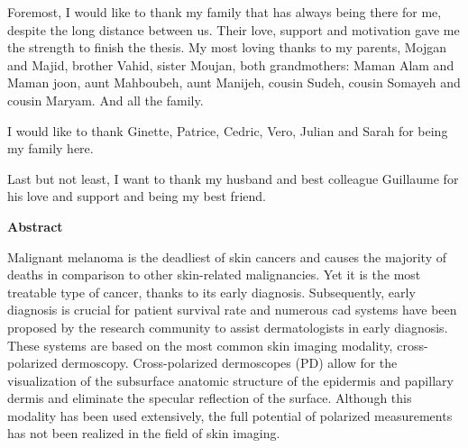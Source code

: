 Foremost, I would like to thank my family that has always being there for me, despite the long distance between us.
Their love, support and motivation gave me the strength to finish the thesis.
My most loving thanks to my parents, Mojgan and Majid, brother Vahid, sister Moujan, both grandmothers: Maman Alam and Maman joon, aunt Mahboubeh, aunt Manijeh, cousin Sudeh, cousin Somayeh and cousin Maryam.
And all the family.

I would like to thank Ginette, Patrice, Cedric, Vero, Julian and Sarah for being my family here.


Last but not least, I want to thank my husband and best colleague Guillaume for his love and support and being my best friend. 
  

 

\cleardoublepage
\doublespacing


\tableofcontents
\cleardoublepage

%

\singlespacing
\begin{center}\textbf{Abstract}\\\end{center}
Malignant melanoma is the deadliest of skin cancers and causes the majority of deaths in comparison to other skin-related malignancies.
Yet it is the most treatable type of cancer, thanks to its early diagnosis.
Subsequently, early diagnosis is crucial for patient survival rate and numerous \ac{cad} systems have been proposed by the research community to assist dermatologists in early diagnosis.
These systems are based on the most common skin imaging modality, cross-polarized dermoscopy.
Cross-polarized dermoscopes (PD) allow for the visualization of the subsurface anatomic structure of the epidermis and papillary dermis and eliminate the specular reflection of the surface.
Although this modality has been used extensively, the full potential of polarized measurements has not been realized in the field of skin imaging.

